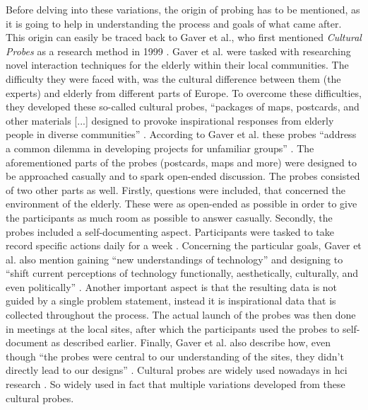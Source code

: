 Before delving into these variations, the origin of probing has to be mentioned, as it is going to help in understanding the process and goals of what came after. This origin can easily be traced back to Gaver et al., who first mentioned \textit{Cultural Probes} as a research method in 1999 \cite{gaver1999design}. Gaver et al. were tasked with researching novel interaction techniques for the elderly within their local communities. The difficulty they were faced with, was the cultural difference between them (the experts) and elderly from different parts of Europe. To overcome these difficulties, they developed these so-called cultural probes, \enquote{packages of maps, postcards, and other materials [...] designed to provoke inspirational responses from elderly people in diverse communities} \cite[p. 22]{gaver1999design}. According to Gaver et al. these probes \enquote{address a common dilemma in developing projects for unfamiliar groups} \cite[p. 22]{gaver1999design}. The aforementioned parts of the probes (postcards, maps and more) were designed to be approached casually and to spark open-ended discussion. The probes consisted of two other parts as well. Firstly, questions were included, that concerned the environment of the elderly. These were as open-ended as possible in order to give the participants as much room as possible to answer casually. Secondly, the probes included a self-documenting aspect. Participants were tasked to take record specific actions daily for a week \cite[p. 22-26]{gaver1999design}. Concerning the particular goals, Gaver et al. also mention gaining \enquote{new understandings of technology} \cite[p. 25]{gaver1999design} and designing to \enquote{shift current perceptions of technology functionally, aesthetically, culturally, and even politically} \cite[p. 25]{gaver1999design}. Another important aspect is that the resulting data is not guided by a single problem statement, instead it is inspirational data that is collected throughout the process. The actual launch of the probes was then done in meetings at the local sites, after which the participants used the probes to self-document as described earlier. Finally, Gaver et al. also describe how, even though \enquote{the probes were central to our understanding of the sites, they didn’t directly lead to our designs} \cite[p. 29]{gaver1999design}. Cultural probes are widely used nowadays in \gls{hci} research \cite{crabtree2003designing,wyeth2006designing,kjeldskov2004using,celikoglu2017user,fisher2016adapting}. So widely used in fact that multiple variations developed from these cultural probes.

